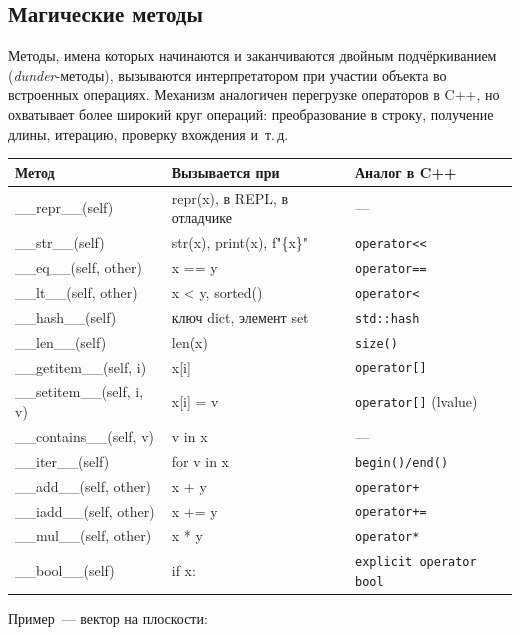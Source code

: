 \documentclass[11pt,a4paper]{article}
\newcommand{\code}[1]{\texttt{#1}}
\begin{document}
\subsection{Магические методы}

Методы, имена которых начинаются и заканчиваются двойным подчёркиванием (\emph{dunder}-методы),
вызываются интерпретатором при участии объекта во встроенных операциях. Механизм аналогичен
перегрузке операторов в C++, но охватывает более широкий круг операций: преобразование в строку,
получение длины, итерацию, проверку вхождения и~т.\,д.

\begin{tabularx}{\linewidth}{@{}>{\ttfamily}l>{\ttfamily}lX@{}}
\toprule
\textrm{\textbf{Метод}} & \textrm{\textbf{Вызывается при}} & \textbf{Аналог в C++} \\
\midrule
\_\_repr\_\_(self) & repr(x), в REPL, в отладчике & --- \\
\_\_str\_\_(self) & str(x), print(x), f"\{x\}" & \code{operator<<} \\
\_\_eq\_\_(self, other) & x == y & \code{operator==} \\
\_\_lt\_\_(self, other) & x < y, sorted() & \code{operator<} \\
\_\_hash\_\_(self) & ключ dict, элемент set & \code{std::hash} \\
\_\_len\_\_(self) & len(x) & \code{size()} \\
\_\_getitem\_\_(self, i) & x[i] & \code{operator[]} \\
\_\_setitem\_\_(self, i, v) & x[i] = v & \code{operator[]} (lvalue) \\
\_\_contains\_\_(self, v) & v in x & --- \\
\_\_iter\_\_(self) & for v in x & \code{begin()/end()} \\
\_\_add\_\_(self, other) & x + y & \code{operator+} \\
\_\_iadd\_\_(self, other) & x += y & \code{operator+=} \\
\_\_mul\_\_(self, other) & x * y & \code{operator*} \\
\_\_bool\_\_(self) & if x: & \code{explicit operator bool} \\
\bottomrule
\end{tabularx}

\medskip
Пример~— вектор на плоскости:
\end{document}
